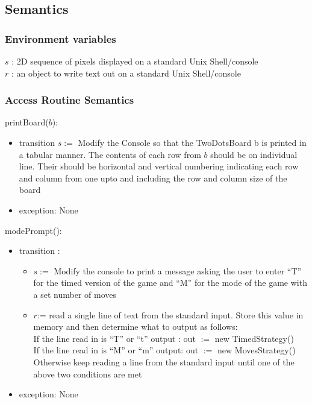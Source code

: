 \documentclass[12pt]{article}
\begin{document}
\subsection* {Semantics}

\subsubsection* {Environment variables}
\noindent $s$ : 2D sequence of pixels displayed on a standard Unix Shell/console\\
\noindent $r$ : an object to write text out on a standard Unix Shell/console\\

\subsubsection* {Access Routine Semantics}

\noindent printBoard($b$): 
\begin{itemize}
\item transition $s:=$ Modify the Console so that the TwoDotsBoard b is printed in a tabular manner. The contents of each row from $b$ should
be on individual line. Their should be horizontal and vertical numbering indicating each row and column from one upto and including the row and column size of the board
\item exception: None
\end{itemize}

\noindent modePrompt(): 
\begin{itemize}
\item transition :
\begin{itemize}
\item $s:=$ Modify the console to print a message asking the user to enter ``T'' for the timed version of the game and ``M'' for the mode of the game with a set number of moves
\item $r$:= read a single line of text from the standard input. Store this value in memory and then determine what to output as follows:\\
If the line read in is ``T'' or ``t'' output : out $ := $ new TimedStrategy()\\
If the line read in is ``M'' or ``m'' output: out $ := $ new MovesStrategy()\\
Otherwise keep reading a line from the standard input until one of the above two conditions are met
\end{itemize}
\item exception: None
\end{itemize}
\end{document}
